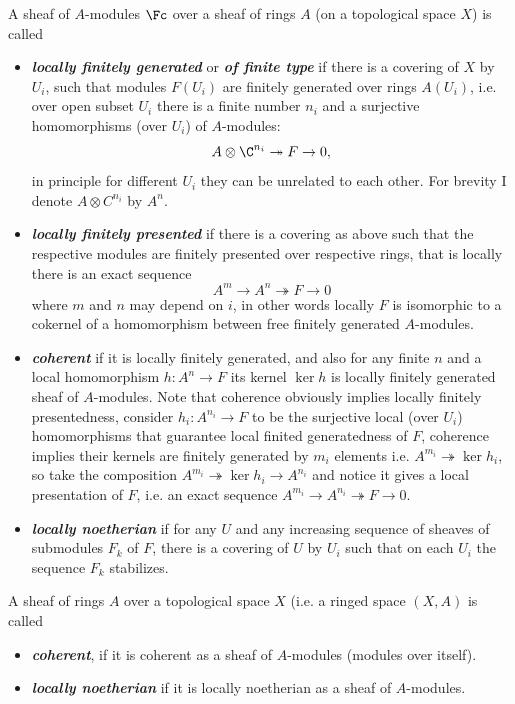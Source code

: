 \begin{defn}A sheaf of $A$-modules $\Fc$ over a sheaf of rings $A$ (on a topological space $X$) is called
	\begin{itemize}
		\item \textbf{\textit{locally finitely generated}} or \textbf{\textit{of finite type}} if there is a covering of $X$ by $U_i$, such that modules $F(U_i)$ are finitely generated over rings $A(U_i)$, i.e. over open subset $U_i$ there is a finite number $n_i$ and a surjective homomorphisms (over $U_i$) of $A$-modules: 
		\[A \otimes \C^{n_i}\twoheadrightarrow F\to 0,\] in principle for different $U_i$ they can be unrelated to each other.   For brevity I denote $A \otimes C^{n_i}$ by $A^n$.
		
		\item \textbf{\textit{locally finitely presented}} if there is a covering as above such that the respective modules are finitely presented over respective rings, that is  locally there is an exact sequence 
		\[A^m\to A^n\twoheadrightarrow F\to 0\]
		where $m$ and $n$ may depend on $i$, in other words locally $F$ is isomorphic to a cokernel of a homomorphism between free finitely generated $A$-modules.
		
		\item \textbf{\textit{coherent}} if it is locally finitely generated, and also for any finite $n$ and a local homomorphism $h : A^n \to F$ its kernel $\ker h$ is locally finitely generated sheaf of $A$-modules. Note that coherence obviously implies locally finitely presentedness,  consider $h_i : A^{n_i} \to F$ to be the surjective local (over $U_i$) homomorphisms that guarantee local finited generatedness of $F$, coherence implies their kernels are finitely generated by $m_i$ elements i.e. $A^{m_i} \twoheadrightarrow \ker h_i$, so take the composition $A^{m_i}\twoheadrightarrow \ker h_i \to A^{n_i}$ and notice it gives a local presentation of $F$, i.e. an exact sequence $A^{m_i} \to A^{n_i}\twoheadrightarrow F\to 0$.

		\item \textbf{\textit{locally noetherian}} if for any $U$ and any increasing sequence of sheaves of submodules $F_k$ of $F$, there is a covering of $U$ by $U_i$ such that on each $U_i$ the sequence $F_k$ stabilizes. 
	\end{itemize}
\end{defn}
\begin{defn}
	A sheaf of rings $A$ over a topological space $X$ (i.e.  a ringed space $(X,A)$ is called
	
	\begin{itemize}
		\item  \textbf{\textit{coherent}}, if it is coherent as a sheaf of $A$-modules (modules over itself).
		
		\item  \textbf{\textit{locally noetherian}} if it is locally noetherian as a sheaf of $A$-modules.
	\end{itemize}
\end{defn}
